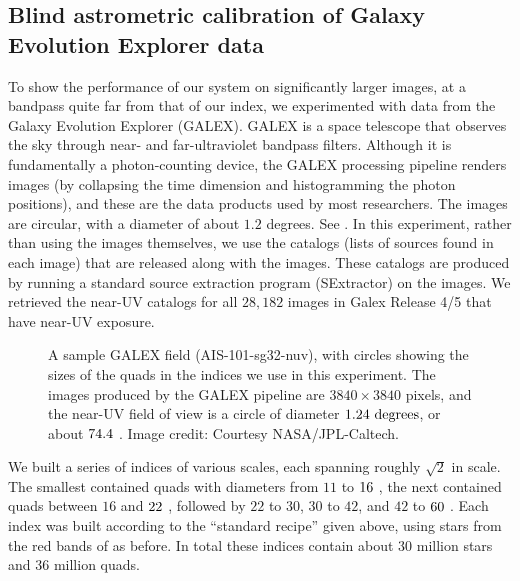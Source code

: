 

\subsection{Blind astrometric calibration of Galaxy Evolution Explorer data}


To show the performance of our system on significantly larger images,
at a bandpass quite far from that of our index, we experimented with
data from the Galaxy Evolution Explorer (GALEX).  GALEX is a space
telescope that observes the sky through near- and far-ultraviolet
bandpass filters.  Although it is fundamentally a photon-counting
device, the GALEX processing pipeline renders images (by collapsing
the time dimension and histogramming the photon positions), and these
are the data products used by most researchers.  The images are
circular, with a diameter of about $1.2$ degrees.  See
.  In this experiment, rather than using the
images themselves, we use the catalogs (lists of sources found in each
image) that are released along with the images.  These catalogs are
produced by running a standard source extraction program (SExtractor)
on the images.  We retrieved the near-UV catalogs for all $28,182$
images in Galex Release 4/5 that have near-UV exposure.


\begin{figure}[htp]
\begin{center}
\galexquadfig
\end{center}
\caption{A sample GALEX field (AIS-101-sg32-nuv),
with circles showing the sizes of the quads in the indices we use in
this experiment.  The images produced by the GALEX pipeline are
$3840\times3840$ pixels, and the near-UV field of view is a circle of
diameter $1.24~\mathrm{degrees}$, or about $74.4~$.  Image credit:
Courtesy NASA/JPL-Caltech.
\label{fig:galexquad}}

\end{figure}



We built a series of indices of various scales, each spanning roughly
$\sqrt{2}$ in scale.  The smallest contained quads with diameters from
$11$ to $16~$, the next contained quads between $16$ and
$22~$, followed by $22$ to $30$, $30$ to $42$, and $42$ to
$60~$.  Each index was built according to the ``standard
recipe'' given above, using stars from the red bands of \usnob as
before.  In total these indices contain about $30$ million stars and
$36$ million quads.


